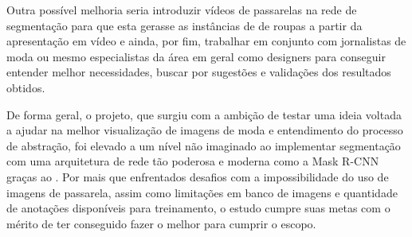 \documentclass[12pt]{report}
\begin{document}
Outra possível melhoria seria introduzir vídeos de passarelas na rede de segmentação para que esta gerasse as instâncias de de roupas a partir da apresentação em vídeo e ainda, por fim, trabalhar em conjunto com jornalistas de moda ou mesmo especialistas da área em geral como designers para conseguir entender melhor necessidades, buscar por sugestões e validações dos resultados obtidos. 

De forma geral, o projeto, que surgiu com a ambição de testar uma ideia voltada a  ajudar na melhor visualização de imagens de moda e entendimento do processo de abstração, foi elevado a um nível não imaginado ao implementar segmentação com uma arquitetura de rede tão poderosa e moderna como a Mask R-CNN graças ao \cite{maskrcnnimplem}. Por mais que enfrentados desafios com a impossibilidade do uso de imagens de passarela, assim como limitações em banco de imagens e quantidade de anotações disponíveis para treinamento, o estudo cumpre suas metas com o mérito de ter conseguido fazer o melhor para cumprir o escopo.

\newpage

\end{document}
